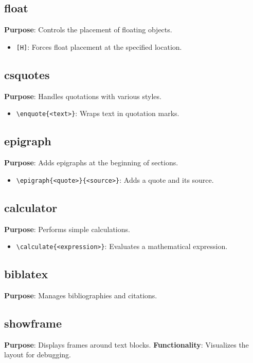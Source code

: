 \documentclass[12pt,twoside]{report}
\begin{document}
\subsection{float}
\textbf{Purpose}: Controls the placement of floating objects.
\begin{itemize}
    \item \texttt{[H]}: Forces float placement at the specified location.
\end{itemize}

\subsection{csquotes}
\textbf{Purpose}: Handles quotations with various styles.
\begin{itemize}
    \item \verb|\enquote{<text>}|: Wraps text in quotation marks.
\end{itemize}

\subsection{epigraph}
\textbf{Purpose}: Adds epigraphs at the beginning of sections.
\begin{itemize}
    \item \verb|\epigraph{<quote>}{<source>}|: Adds a quote and its source.
\end{itemize}

\subsection{calculator}
\textbf{Purpose}: Performs simple calculations.
\begin{itemize}
    \item \verb|\calculate{<expression>}|: Evaluates a mathematical expression.
\end{itemize}

\subsection{biblatex}
\textbf{Purpose}: Manages bibliographies and citations.

\subsection{showframe}
\textbf{Purpose}: Displays frames around text blocks.
\textbf{Functionality}: Visualizes the layout for debugging.
\end{document}
